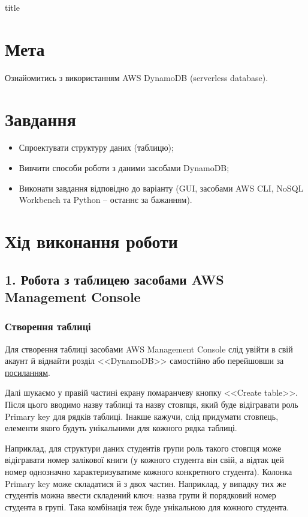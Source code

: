 \documentclass[a4paper,14pt]{extarticle} %
\begin{document}
{title}

\newpage

\section*{Мета}

Ознайомитись з використанням AWS DynamoDB (serverless database).

\section*{Завдання} 

\begin{itemize}
    \item Спроектувати структуру даних (таблицю);
    \item Вивчити способи роботи з даними засобами DynamoDB;
    \item Виконати завдання відповідно до варіанту (GUI, засобами AWS CLI, NoSQL Workbench та Python -- останнє за бажанням).
\end{itemize}

\section*{Хід виконання роботи}

\subsection*{1. Робота з таблицею заcобами AWS Management Console}

\subsubsection*{Створення таблиці}

Для створення таблиці засобами AWS Management Console слід увійти в свій акаунт й віднайти розділ <<DynamoDB>> 
самостійно або перейшовши за \href{https://us-east-1.console.aws.amazon.com/dynamodbv2/home?region=us-east-1#dashboard}{посиланням}.

Далі шукаємо у правій частині екрану помаранчеву кнопку <<Create table>>. Після цього вводимо назву таблиці та 
назву стовпця, який буде відігравати роль Primary key для рядків таблиці. Інакше кажучи, слід придумати стовпець, 
елементи якого будуть унікальними для кожного рядка таблиці. 

Наприклад, для структури даних студентів групи роль такого стовпця може відігравати номер залікової книги 
(у кожного студента він свій, а відтак цей номер однозначно характеризуватиме кожного конкретного студента). 
Колонка Primary key може складатися й з двох частин. Наприклад, у випадку тих же студентів можна 
ввести складений ключ: назва групи й порядковий номер студента в групі. Така комбінація теж буде 
унікальною для кожного студента.
\end{document}
